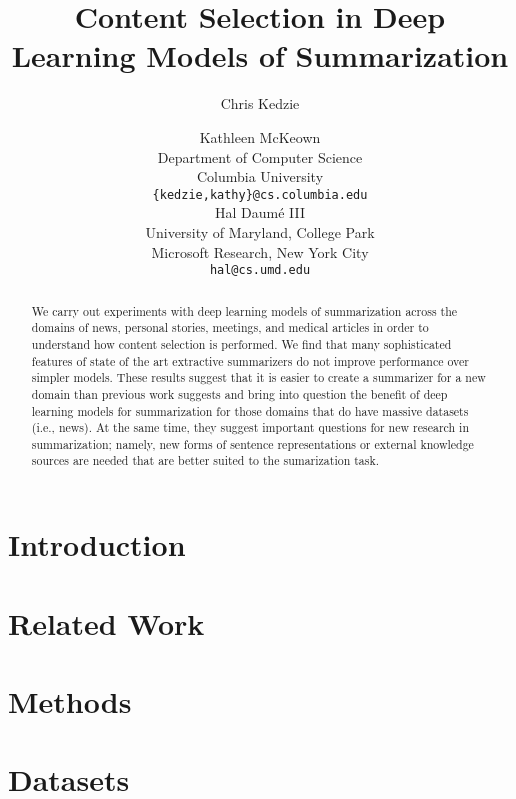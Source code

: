 \documentclass[11pt,a4paper]{article}
\title{Content Selection in Deep Learning Models of Summarization}
\author{Chris Kedzie \and Kathleen McKeown\\
  Department of Computer Science \\
  Columbia University \\
  {\tt \{kedzie,kathy\}@cs.columbia.edu} \\\And
  Hal Daum\'e III  \\
  University of Maryland, College Park \\
  Microsoft Research, New York City \\
  {\tt hal@cs.umd.edu} \\}
\date{}
\begin{document}
\maketitle
\begin{abstract}
We carry out experiments with deep learning models of summarization across the domains of news, personal stories, meetings, and medical articles in order to understand how content selection is performed. We find that many sophisticated features of state of the art extractive summarizers do not improve performance over simpler models. These results suggest that it is easier to create a summarizer for  a new domain than previous work suggests and bring into question the benefit of deep learning models for summarization for those domains that do have massive datasets (i.e., news). At the same time, they suggest important questions for new research in summarization; namely,  new forms of sentence representations or external knowledge sources are needed that are better suited to the sumarization task. 
\end{abstract}



\section{Introduction}


\section{Related Work} \label{sec:related}


\section{Methods}


%



\section{Datasets}
\label{sec:datasets}




\end{document}
